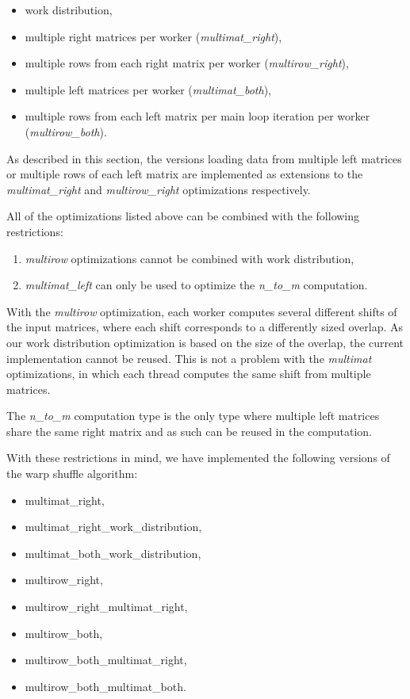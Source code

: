 \begin{itemize}
	\item work distribution,
	\item multiple right matrices per worker (\textit{multimat\_right}),
	\item multiple rows from each right matrix per worker (\textit{multirow\_right}),
	\item multiple left matrices per worker (\textit{multimat\_both}),
	\item multiple rows from each left matrix per main loop iteration per worker (\textit{multirow\_both}).
\end{itemize}

As described in this section, the versions loading data from multiple left matrices or multiple rows of each left matrix are implemented as extensions to the \textit{multimat\_right} and \textit{multirow\_right} optimizations respectively.


All of the optimizations listed above can be combined with the following restrictions:

\begin{enumerate}
	\item \textit{multirow} optimizations cannot be combined with work distribution,
	\item \textit{multimat\_left} can only be used to optimize the \textit{n\_to\_m} computation. 
\end{enumerate}

With the \textit{multirow} optimization, each worker computes several different shifts of the input matrices, where each shift corresponds to a differently sized overlap. As our work distribution optimization is based on the size of the overlap, the current implementation cannot be reused. This is not a problem with the \textit{multimat} optimizations, in which each thread computes the same shift from multiple matrices.

The \textit{n\_to\_m} computation type is the only type where multiple left matrices share the same right matrix and as such can be reused in the computation.


With these restrictions in mind, we have implemented the following versions of the warp shuffle algorithm:

\begin{itemize}
	\item multimat\_right,
	\item multimat\_right\_work\_distribution,
	\item multimat\_both\_work\_distribution,
	\item multirow\_right,
	\item multirow\_right\_multimat\_right,
	\item multirow\_both,
	\item multirow\_both\_multimat\_right,
	\item multirow\_both\_multimat\_both.
\end{itemize}


